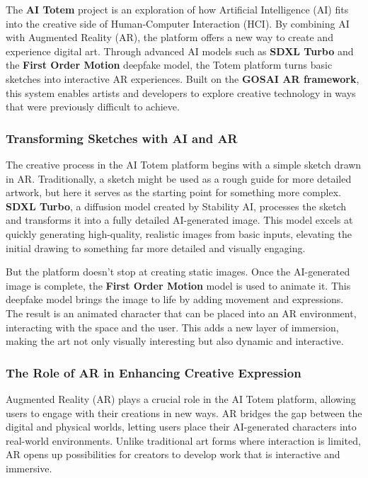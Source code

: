The \textbf{AI Totem} project is an exploration of how Artificial Intelligence (AI) fits into the creative side of Human-Computer Interaction (HCI).
By combining AI with Augmented Reality (AR), the platform offers a new way to create and experience digital art.
Through advanced AI models such as \textbf{SDXL Turbo} and the \textbf{First Order Motion} deepfake model, the Totem platform turns basic sketches into interactive AR experiences.
Built on the \textbf{GOSAI AR framework}, this system enables artists and developers to explore creative technology in ways that were previously difficult to achieve.

\subsubsection{ Transforming Sketches with AI and AR}

The creative process in the AI Totem platform begins with a simple sketch drawn in AR.
Traditionally, a sketch might be used as a rough guide for more detailed artwork, but here it serves as the starting point for something more complex.
\textbf{SDXL Turbo}, a diffusion model created by Stability AI, processes the sketch and transforms it into a fully detailed AI-generated image.
This model excels at quickly generating high-quality, realistic images from basic inputs, elevating the initial drawing to something far more detailed and visually engaging.

But the platform doesn’t stop at creating static images.
Once the AI-generated image is complete, the \textbf{First Order Motion} model is used to animate it.
This deepfake model brings the image to life by adding movement and expressions.
The result is an animated character that can be placed into an AR environment, interacting with the space and the user. This adds a new layer of immersion, making the art not only visually interesting but also dynamic and interactive.

\subsubsection{ The Role of AR in Enhancing Creative Expression}

Augmented Reality (AR) plays a crucial role in the AI Totem platform, allowing users to engage with their creations in new ways.
AR bridges the gap between the digital and physical worlds, letting users place their AI-generated characters into real-world environments.
Unlike traditional art forms where interaction is limited, AR opens up possibilities for creators to develop work that is interactive and immersive.

